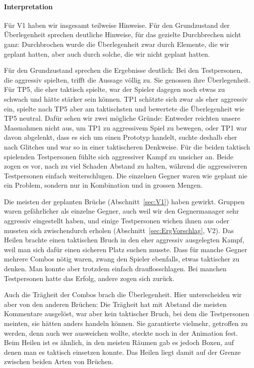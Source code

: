 \documentclass[../Main.tex]{subfiles}
\begin{document}
\paragraph{Interpretation}
Für V1 haben wir insgesamt teilweise Hinweise. Für den Grundzustand der Überlegenheit sprechen deutliche Hinweise, für das gezielte Durchbrechen nicht ganz: Durchbrochen wurde die Überlegenheit zwar durch Elemente, die wir geplant hatten, aber auch durch solche, die wir nicht geplant hatten.

Für den Grundzustand sprechen die Ergebnisse deutlich: Bei den Testpersonen, die aggressiv spielten, trifft die Aussage völlig zu. Sie genossen ihre Überlegenheit. Für TP5, die eher taktisch spielte, war der Spieler dagegen noch etwas zu schwach und hätte stärker sein können. TP1 schätzte sich zwar als eher aggressiv ein, spielte nach TP5 aber am taktischsten und bewertete die Überlegenheit wie TP5 neutral. Dafür sehen wir zwei mögliche Gründe: Entweder reichten unsere Massnahmen nicht aus, um TP1 zu aggressivem Spiel zu bewegen, oder TP1 war davon abgelenkt, dass es sich um einen Prototyp handelt, suchte deshalb eher nach Glitches und war so in einer taktischeren Denkweise. Für die beiden taktisch spielenden Testpersonen fühlte sich aggressiver Kampf zu unsicher an. Beide zogen es vor, nach zu viel Schaden Abstand zu halten, während die aggressiveren Testpersonen einfach weiterschlugen. Die einzelnen Gegner waren wie geplant nie ein Problem, sondern nur in Kombination und in grossen Mengen.

Die meisten der geplanten Brüche (Abschnitt~\ref{sec:V1}) haben gewirkt. Gruppen waren gefährlicher als einzelne Gegner, auch weil wir den Gegnermanager sehr aggressiv eingestellt haben, und einige Testpersonen wichen ihnen aus oder mussten sich zwischendurch erholen (Abschnitt~\ref{sec:ErgVorschlag}, V2). Das Heilen brachte einen taktischen Bruch in den eher aggressiv ausgelegten Kampf, weil man sich dafür einen sicheren Platz suchen musste. Dass für manche Gegner mehrere Combos nötig waren, zwang den Spieler ebenfalls, etwas taktischer zu denken. Man konnte aber trotzdem einfach drauflosschlagen. Bei manchen Testpersonen hatte das Erfolg, andere zogen sich zurück.

Auch die Trägheit der Combos brach die Überlegenheit. Hier unterscheiden wir aber von den anderen Brüchen: Die Trägheit hat mit Abstand die meisten Kommentare ausgelöst, war aber kein taktischer Bruch, bei dem die Testpersonen meinten, sie hätten anders handeln können. Sie garantierte vielmehr, getroffen zu werden, denn auch wer ausweichen wollte, steckte noch in der Animation fest. Beim Heilen ist es ähnlich, in den meisten Räumen gab es jedoch Boxen, auf denen man es taktisch einsetzen konnte. Das Heilen liegt damit auf der Grenze zwischen beiden Arten von Brüchen.
\end{document}
